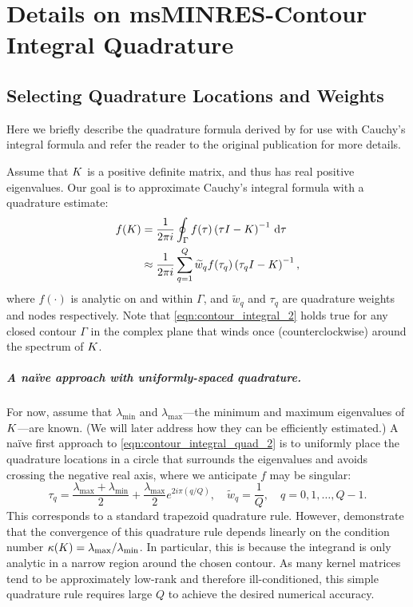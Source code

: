 \chapter{Details on msMINRES-Contour Integral Quadrature}
\label{app:quadrature}

\section{Selecting Quadrature Locations and Weights}
Here we briefly describe the quadrature formula derived by \citet{hale2008computing} for use with Cauchy's integral formula and refer the reader to the original publication for more details.

Assume that $K$ is a positive definite matrix, and thus has real positive eigenvalues.
Our goal is to approximate Cauchy's integral formula with a quadrature estimate:
%
\begin{align}
	f(K)
  &= \frac{1}{2 \pi i} \oint_\Gamma f(\tau) \left( \tau I - K \right)^{-1} \,\mathrm{d}{\tau}
  \label{eqn:contour_integral_2}
  \\
  &\approx
  \frac{1}{2 \pi i} \sum_{q=1}^Q \widetilde w_q f(\tau_q) \left( \tau_q I - K \right)^{-1},
  \label{eqn:contour_integral_quad_2}
\end{align}
%
where $f(\cdot)$ is analytic on and within $\Gamma$, and $\widetilde w_q$ and $\tau_q$ are quadrature weights and nodes respectively.
Note that \cref{eqn:contour_integral_2} holds true for any closed contour $\Gamma$ in the complex plane that winds once (counterclockwise) around the spectrum of $K$.

\paragraph{A na\"ive approach with uniformly-spaced quadrature.}
For now, assume that $\lambda_\text{min}$ and $\lambda_\text{max}$---the minimum and maximum eigenvalues of $K$---are known.
(We will later address how they can be efficiently estimated.)
A na\"ive first approach to \cref{eqn:contour_integral_quad_2} is to uniformly place the quadrature locations in a circle that surrounds the eigenvalues and avoids crossing the negative real axis, where we anticipate $f$ may be singular:
%
\[
  \tau_q = \frac{\lambda_{\max}+\lambda_{\min}}{2} + \frac{\lambda_{\max}}{2}e^{2 i \pi \left( q / Q \right)},
  \quad
  \widetilde w_q = \frac 1 Q, \quad q=0,1,\ldots,Q-1.
\]
%
This corresponds to a standard trapezoid quadrature rule. However, \citet{hale2008computing} demonstrate that the convergence of this quadrature rule depends linearly on the condition number $\kappa(K) = \lambda_\text{max} / \lambda_\text{min}$. In particular, this is because the integrand is only analytic in a narrow region around the chosen contour. As many kernel matrices tend to be approximately low-rank and therefore ill-conditioned, this simple quadrature rule requires large $Q$ to achieve the desired numerical accuracy.

